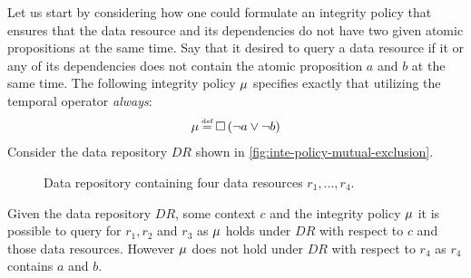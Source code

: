 \begin{example}[]\label{ex:mutual-exclusion}
Let us start by considering how one could formulate an integrity policy that ensures that the data resource and its dependencies do not have two given atomic propositions at the same time. Say that it desired to query a data resource if it or any of its dependencies does not contain the atomic proposition $a$ and $b$ at the same time. The following integrity policy $\mu$ specifies exactly that utilizing the temporal operator \emph{always}:
\begin{align*}
    \inte \eqdef  \G \left( \lnot a \lor \lnot b \right)
\end{align*}
Consider the data repository $DR$ shown in \autoref{fig:inte-policy-mutual-exclusion}.
\begin{figure}[!ht]
    \begin{center}
        
        \caption{Data repository containing four data resources $r_1, \ldots, r_4$.}
        \label{fig:inte-policy-mutual-exclusion}
    \end{center}
\end{figure}
Given the data repository $DR$, some context $c$ and the integrity policy $\mu$ it is possible to query for $r_1, r_2$ and $r_3$ as $\mu$ holds under $DR$ with respect to $c$ and those data resources. However $\mu$ does not hold under $DR$ with respect to $r_4$ as $r_4$ contains $a$ and $b$.
\end{example}


